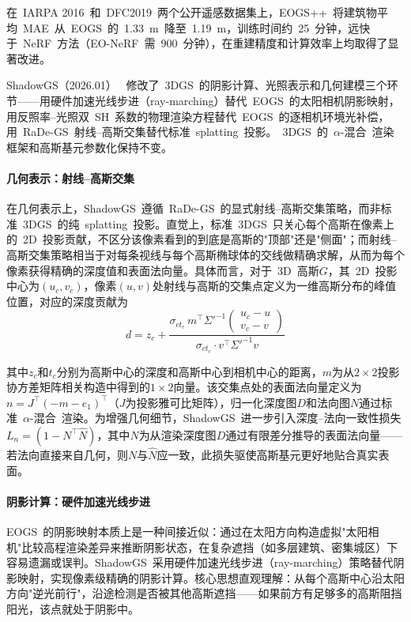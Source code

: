 在~IARPA 2016~和~DFC2019~两个公开遥感数据集上，EOGS++~将建筑物平均~MAE~从~EOGS~的~1.33~m~降至~1.19~m，训练时间约~25~分钟，远快于~NeRF~方法（EO-NeRF~需~900~分钟），在重建精度和计算效率上均取得了显著改进。

ShadowGS（2026.01）~\cite{2601_00939} 修改了~3DGS~的阴影计算、光照表示和几何建模三个环节——用硬件加速光线步进（ray-marching）替代~EOGS~的太阳相机阴影映射，用反照率--光照双~SH~系数的物理渲染方程替代~EOGS~的逐相机环境光补偿，用~RaDe-GS~射线--高斯交集替代标准~splatting~投影。~3DGS~的~$\alpha$-混合~渲染框架和高斯基元参数化保持不变。

\paragraph{几何表示：射线--高斯交集} 在几何表示上，ShadowGS~遵循~RaDe-GS~的显式射线--高斯交集策略，而非标准~3DGS~的纯~splatting~投影。直觉上，标准~3DGS~只关心每个高斯在像素上的~2D~投影贡献，不区分该像素看到的到底是高斯的"顶部"还是"侧面"；而射线--高斯交集策略相当于对每条视线与每个高斯椭球体的交线做精确求解，从而为每个像素获得精确的深度值和表面法向量。具体而言，对于~3D~高斯$G$，其~2D~投影中心为$(u_c, v_c)$，像素$(u, v)$处射线与高斯的交集点定义为一维高斯分布的峰值位置，对应的深度贡献为
\begin{equation}
d = z_c + \frac{\sigma_{ct_c} \, m^\top \Sigma'^{-1} \begin{pmatrix} u_c - u \\ v_c - v \end{pmatrix}}{\sigma_{ct_c} \cdot v^\top \Sigma'^{-1} v}
\end{equation}

其中$z_c$和$t_c$分别为高斯中心的深度和高斯中心到相机中心的距离，$m$为从$2\times 2$投影协方差矩阵相关构造中得到的$1\times 2$向量。该交集点处的表面法向量定义为$n = J^\top (-m - e_1)^\top$（$J$为投影雅可比矩阵），归一化深度图$D$和法向图$N$通过标准~$\alpha$-混合~渲染。为增强几何细节，ShadowGS~进一步引入深度--法向一致性损失$L_n = (1 - N^\top \hat{N})$，其中$\hat{N}$为从渲染深度图$D$通过有限差分推导的表面法向量——若法向直接来自几何，则$N$与$\hat{N}$应一致，此损失驱使高斯基元更好地贴合真实表面。

\paragraph{阴影计算：硬件加速光线步进} EOGS~的阴影映射本质上是一种间接近似：通过在太阳方向构造虚拟"太阳相机"比较高程渲染差异来推断阴影状态，在复杂遮挡（如多层建筑、密集城区）下容易遗漏或误判。ShadowGS~采用硬件加速光线步进（ray-marching）策略替代阴影映射，实现像素级精确的阴影计算。核心思想直观理解：从每个高斯中心沿太阳方向"逆光前行"，沿途检测是否被其他高斯遮挡——如果前方有足够多的高斯阻挡阳光，该点就处于阴影中。

